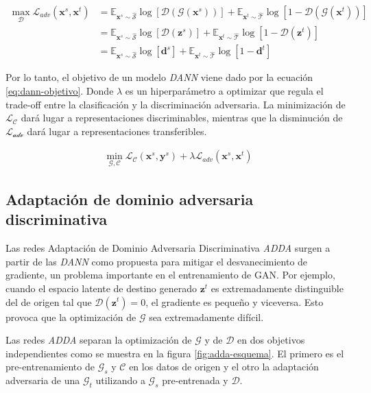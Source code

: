 \begin{align}
    \max_{\mathcal{D}} \mathcal{L}_{adv}(\mathbf{x}^s, \mathbf{x}^t) & = \mathbb{E}_{\mathbf{x}^s \sim \mathcal{\hat{S}}}\log[\mathcal{D}(\mathcal{G}(\mathbf{x}^s))] + \mathbb{E}_{\mathbf{x}^t \sim \mathcal{\hat{T}}}\log[1-\mathcal{D}(\mathcal{G}(\mathbf{x}^t))] \nonumber \\
                                                                     & = \mathbb{E}_{\mathbf{x}^s \sim \mathcal{\hat{S}}}\log[\mathcal{D}(\mathbf{z}^s)] + \mathbb{E}_{\mathbf{x}^t \sim \mathcal{\hat{T}}}\log[1-\mathcal{D}(\mathbf{z}^t)] \nonumber                           \\
                                                                     & = \mathbb{E}_{\mathbf{x}^s \sim \mathcal{\hat{S}}}\log[\mathbf{d}^s] + \mathbb{E}_{\mathbf{x}^t \sim \mathcal{\hat{T}}}\log[1-\mathbf{d}^t]
    \label{eq:dann-loss-discriminadora}
\end{align}

Por lo tanto, el objetivo de un modelo {\it DANN} viene dado por la ecuación \ref{eq:dann-objetivo}. Donde $\lambda$ es
un hiperparámetro a optimizar que regula el trade-off entre la clasificación y la discriminación adversaria. La
minimización de $\mathcal{L}_\mathcal{C}$ dará lugar a representaciones discriminables, mientras que la disminución de
$\mathcal{L}_\mathcal{adv}$ dará lugar a representaciones transferibles.

\begin{align}
    \min_{\mathcal{G},\mathcal{C}} \mathcal{L}_\mathcal{C}(\mathbf{x}^s, \mathbf{y}^s) + \lambda \mathcal{L}_{adv}(\mathbf{x}^s, \mathbf{x}^t)
    \label{eq:dann-objetivo}
\end{align}

\subsection{Adaptación de dominio adversaria discriminativa}
Las redes Adaptación de Dominio Adversaria Discriminativa {\it ADDA} \parencite{tzeng2017adversarial} surgen a partir de las {\it DANN} como propuesta para mitigar el desvanecimiento de
gradiente, un problema importante en el entrenamiento de GAN. Por ejemplo, cuando el espacio latente de destino
generado $\mathbf{z}^t$ es extremadamente distinguible del de origen tal que $\mathcal{D}(\mathbf{z}^t)=0$, el
gradiente es pequeño y viceversa. Esto provoca que la optimización de $\mathcal{G}$ sea extremadamente difícil.

Las redes {\it ADDA} separan la optimización de $\mathcal{G}$ y de $\mathcal{D}$ en dos objetivos independientes como
se muestra en la figura \ref{fig:adda-esquema}. El primero es el pre-entrenamiento de $\mathcal{G}_s$ y $\mathcal{C}$
en los datos de origen y el otro la adaptación adversaria de una $\mathcal{G}_t$ utilizando a $\mathcal{G}_s$
pre-entrenada y $\mathcal{D}$.

